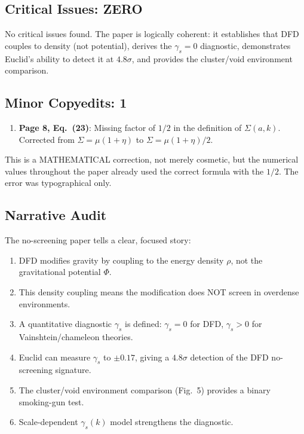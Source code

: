 \documentclass[11pt,a4paper]{article}
\begin{document}
\subsection{Critical Issues: ZERO}

No critical issues found. The paper is logically coherent: it establishes that DFD couples to density (not potential), derives the $\gamma_s = 0$ diagnostic, demonstrates Euclid's ability to detect it at $4.8\sigma$, and provides the cluster/void environment comparison.

\subsection{Minor Copyedits: 1}

\begin{enumerate}
\item \textbf{Page 8, Eq.\ (23)}: Missing factor of $1/2$ in the definition of $\Sigma(a,k)$. Corrected from $\Sigma = \mu(1+\eta)$ to $\Sigma = \mu(1+\eta)/2$.
\end{enumerate}

This is a MATHEMATICAL correction, not merely cosmetic, but the numerical values throughout the paper already used the correct formula with the $1/2$. The error was typographical only.

\subsection{Narrative Audit}

The no-screening paper tells a clear, focused story:
\begin{enumerate}
\item DFD modifies gravity by coupling to the energy density $\rho$, not the gravitational potential $\Phi$.
\item This density coupling means the modification does NOT screen in overdense environments.
\item A quantitative diagnostic $\gamma_s$ is defined: $\gamma_s = 0$ for DFD, $\gamma_s > 0$ for Vainshtein/chameleon theories.
\item Euclid can measure $\gamma_s$ to $\pm 0.17$, giving a $4.8\sigma$ detection of the DFD no-screening signature.
\item The cluster/void environment comparison (Fig.~5) provides a binary smoking-gun test.
\item Scale-dependent $\gamma_s(k)$ model strengthens the diagnostic.
\end{enumerate}
\end{document}
